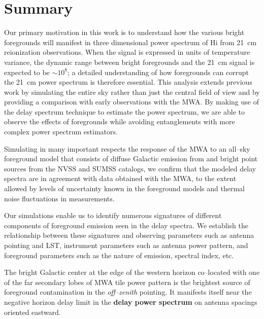 \documentclass[preprint2,iop,numberedappendix]{emulateapj}
\begin{document}
\section{Summary}\label{sec:summary}

Our primary motivation in this work is to understand how the various bright foregrounds will manifest in three dimensional power spectrum of H{\sc i} from 21~cm reionization observations. When the signal is expressed in units of temperature variance, the dynamic range between bright foregrounds and the 21~cm signal is expected to be $\sim 10^8$; a detailed understanding of how foregrounds can corrupt the 21~cm power spectrum is therefore essential. This analysis extends previous work by simulating the entire sky rather than just the central field of view and by providing a comparison with early observations with the MWA. By making use of the delay spectrum technique to estimate the power spectrum, we are able to observe the effects of foregrounds while avoiding entanglements with more complex power spectrum estimators.  

Simulating in many important respects the response of the MWA to an all--sky foreground model that consists of diffuse Galactic emission from \citet{deo08} and bright point sources from the NVSS and SUMSS catalogs, we confirm that the modeled delay spectra are in agreement with data obtained with the MWA, to the extent allowed by levels of uncertainty known in the foreground models and thermal noise fluctuations in measurements. 

Our simulations enable us to identify numerous signatures of different components of foreground emission seen in the delay spectra. We establish the relationship between these signatures and observing parameters such as antenna pointing and LST, instrument parameters such as antenna power pattern, and foreground parameters such as the nature of emission, spectral index, etc. 

The bright Galactic center at the edge of the western horizon co--located with one of the far secondary lobes of MWA tile power pattern is the brightest source of foreground contamination in the {\it off--zenith} pointing. It manifests itself near the negative horizon delay limit in the {\bf delay power spectrum} on antenna spacings oriented eastward. 
\end{document}
